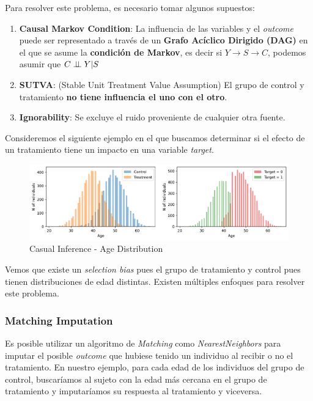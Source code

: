 Para resolver este problema, es necesario tomar algunos supuestos: 
\begin{enumerate}
    \item \textbf{Causal Markov Condition}: La influencia de las variables y el \textit{outcome} puede ser representado a través de un \textbf{Grafo Acíclico Dirigido (DAG)} en el que se asume la \textbf{condición de Markov}, es decir si $Y \rightarrow S \rightarrow C$, podemos asumir que $C \perp \!\!\! \perp Y | S$
    \item \textbf{SUTVA}: (Stable Unit Treatment Value Assumption) El grupo de control y tratamiento \textbf{no tiene influencia el uno con el otro}. 
    \item \textbf{Ignorability}: Se excluye el ruido proveniente de cualquier otra fuente. 
\end{enumerate}

Consideremos el siguiente ejemplo en el que buscamos determinar si el efecto de un tratamiento tiene un impacto en una variable \textit{target}. 

\begin{figure}[H]
    \center
    \includegraphics[scale=0.4]{notebooks/STATS/img/causal_inference_age_distribution.png}
    \caption{Casual Inference - Age Distribution}
\end{figure}

Vemos que existe un \textit{selection bias} pues el grupo de tratamiento y control pues tienen distribuciones de edad distintas. Existen múltiples enfoques para resolver este problema. 

\subsubsection{Matching Imputation}

Es posible utilizar un algoritmo de \textit{Matching} como \textit{NearestNeighbors} para imputar el posible \textit{outcome} que hubiese tenido un individuo al recibir o no el tratamiento. En nuestro ejemplo, para cada edad de los individuos del grupo de control, buscaríamos al sujeto con la edad más cercana en el grupo de tratamiento y imputaríamos su respuesta al tratamiento y viceversa. 

